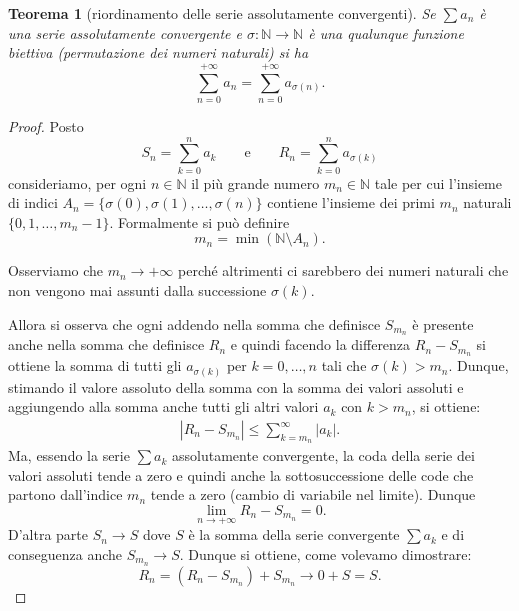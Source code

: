 \documentclass[italian,a4paper,oneside,headinclude]{scrbook}
\newcommand{\NN}{\mathbb N}
\newcommand{\abs}[1]{{\left|#1\right|}}
\newtheorem{theorem}{Teorema}
\begin{document}
\begin{theorem}[riordinamento delle serie assolutamente convergenti]
Se $\sum a_n$ è una serie assolutamente convergente e $\sigma\colon \NN \to \NN$
è una qualunque funzione biettiva (permutazione dei numeri naturali)
si ha
\[
  \sum_{n=0}^{+\infty} a_n = \sum_{n=0}^{+\infty} a_{\sigma(n)}.
\]
\end{theorem}
%
\begin{proof}
Posto
\[
  S_n = \sum_{k=0}^n a_k
  \qquad\text{e}\qquad
  R_n = \sum_{k=0}^{n} a_{\sigma(k)}
\]
consideriamo, per ogni $n\in \NN$ il più grande numero
$m_n\in \NN$ tale per cui
l'insieme di indici $A_n = \{ \sigma(0), \sigma(1), \dots, \sigma(n)\}$
contiene l'insieme dei primi $m_n$ naturali $\{0, 1, \dots, m_n -1 \}$.
Formalmente si può definire
\[
  m_n = \min (\NN \setminus A_n).
\]

Osserviamo che $m_n\to +\infty$ perché altrimenti ci sarebbero dei
numeri naturali che non vengono mai assunti dalla successione $\sigma(k)$.

Allora si osserva che ogni addendo nella somma che definisce
$S_{m_n}$ è presente anche
nella somma che definisce $R_n$ e quindi
facendo la differenza $R_n - S_{m_n}$ si ottiene la somma di tutti
gli $a_{\sigma(k)}$ per $k=0,\dots,n$ tali che $\sigma(k) > m_n$.
Dunque, stimando il valore assoluto della somma con la somma dei valori
assoluti e aggiungendo alla somma anche tutti gli altri valori $a_k$ con $k>m_n$, si ottiene:
\begin{align*}
\abs{R_n - S_{m_n}}
\le \sum_{k=m_n}^\infty \abs{a_k}.
\end{align*}
Ma, essendo la serie $\sum a_k$ assolutamente convergente, la coda della serie dei valori assoluti tende a zero e quindi anche la sottosuccessione
delle code che partono dall'indice $m_n$ tende a zero (cambio di variabile
nel limite). Dunque
\[
  \lim_{n\to +\infty} R_n - S_{m_n} = 0.
\]
D'altra parte $S_n\to S$ dove $S$ è la somma della serie convergente
$\sum a_k$ e di conseguenza anche $S_{m_n} \to S$.
Dunque si ottiene, come volevamo dimostrare:
\[
 R_n = (R_n - S_{m_n}) + S_{m_n} \to 0 + S = S.
\]
\end{proof}
\end{document}
